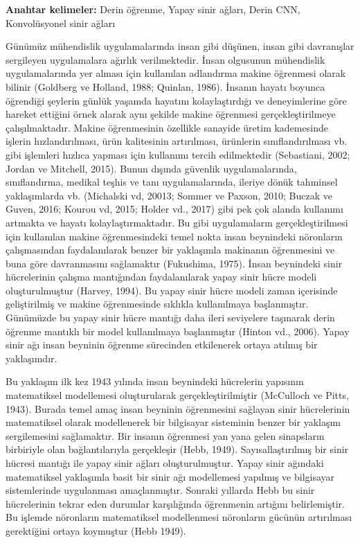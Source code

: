 \documentclass{article}
\begin{document}
\vspace{10pt}
\textbf {Anahtar kelimeler:} Derin öğrenme, Yapay sinir ağları, Derin CNN, Konvolüsyonel sinir ağları


\begin{multicols}{2}
Günümüz mühendislik uygulamalarında insan
gibi düşünen, insan gibi davranışlar sergileyen
uygulamalara ağırlık verilmektedir. İnsan
olgusunun mühendislik uygulamalarında yer
alması için kullanılan adlandırma makine
öğrenmesi olarak bilinir (Goldberg ve Holland,
1988; Quinlan, 1986). İnsanın hayatı boyunca
öğrendiği şeylerin günlük yaşamda hayatını
kolaylaştırdığı ve deneyimlerine göre hareket
ettiğini örnek alarak aynı şekilde makine
öğrenmesi gerçekleştirilmeye çalışılmaktadır.
Makine öğrenmesinin özellikle sanayide üretim
kademesinde işlerin hızlandırılması, ürün
kalitesinin artırılması, ürünlerin sınıflandırılması
vb. gibi işlemleri hızlıca yapması için kullanımı
tercih edilmektedir (Sebastiani, 2002; Jordan ve
Mitchell, 2015). Bunun dışında güvenlik
uygulamalarında, sınıflandırma, medikal teşhis
ve tanı uygulamalarında, ileriye dönük tahminsel
yaklaşımlarda vb. (Michalski vd, 20013;
Sommer ve Paxson, 2010; Buczak ve Guven,
2016; Kourou vd, 2015; Holder vd., 2017) gibi
pek çok alanda kullanımı artmakta ve hayatı
kolaylaştırmaktadır. Bu gibi uygulamaların
gerçekleştirilmesi için kullanılan makine
öğrenmesindeki temel nokta insan beynindeki
nöronların çalışmasından faydalanılarak benzer
bir yaklaşımla makinanın öğrenmesini ve buna
göre davranmasını sağlamaktır (Fukushima,
1975). İnsan beynindeki sinir hücrelerinin
çalışma mantığından faydalanılarak yapay sinir
hücre modeli oluşturulmuştur (Harvey, 1994).
Bu yapay sinir hücre modeli zaman içerisinde
geliştirilmiş ve makine öğrenmesinde sıklıkla
kullanılmaya başlanmıştır. Günümüzde bu yapay
sinir hücre mantığı daha ileri seviyelere taşınarak
derin öğrenme mantıklı bir model kullanılmaya
başlanmıştır (Hinton vd., 2006). Yapay sinir ağı insan beyninin öğrenme
sürecinden etkilenerek ortaya atılmış bir
yaklaşımdır. 
\end{multicols}

\newpage
Bu yaklaşım ilk kez 1943 yılında
insan beynindeki hücrelerin yapısının
matematiksel modellemesi oluşturularak
gerçekleştirilmiştir (McCulloch ve Pitts, 1943). Burada temel amaç insan beyninin öğrenmesini
sağlayan sinir hücrelerinin matematiksel olarak
modellenerek bir bilgisayar sisteminin benzer bir
yaklaşım sergilemesini sağlamaktır. Bir insanın
öğrenmesi yan yana gelen sinapsların birbiriyle
olan bağlantılarıyla gerçekleşir (Hebb, 1949).
Sayısallaştırılmış bir sinir hücresi mantığı ile
yapay sinir ağları oluşturulmuştur.
Yapay sinir ağındaki matematiksel yaklaşımla
basit bir sinir ağı modellemesi yapılmış ve
bilgisayar sistemlerinde uygulanması
amaçlanmıştır. Sonraki yıllarda Hebb bu sinir
hücrelerinin tekrar eden durumlar karşılığında
öğrenmenin artığını belirlemiştir. Bu işlemde
nöronların matematiksel modellenmesi
nöronların gücünün artırılması gerektiğini ortaya
koymuştur (Hebb 1949).
\end{document}
